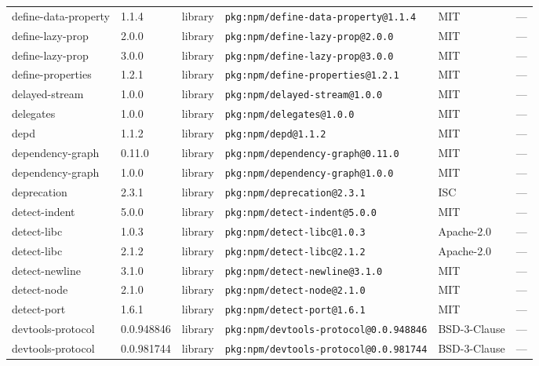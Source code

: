 \documentclass[11pt,a4paper]{article}
\begin{document}
\begin{longtable}{|p{4cm}|p{2cm}|p{1.6cm}|p{5cm}|p{1.5cm}|p{3.5cm}|}
\raggedright define-data-property & 1.1.4 & library & \small\texttt{pkg:npm/define-data-property@1.1.4} & MIT & \small — \\
\raggedright define-lazy-prop & 2.0.0 & library & \small\texttt{pkg:npm/define-lazy-prop@2.0.0} & MIT & \small — \\
\raggedright define-lazy-prop & 3.0.0 & library & \small\texttt{pkg:npm/define-lazy-prop@3.0.0} & MIT & \small — \\
\raggedright define-properties & 1.2.1 & library & \small\texttt{pkg:npm/define-properties@1.2.1} & MIT & \small — \\
\raggedright delayed-stream & 1.0.0 & library & \small\texttt{pkg:npm/delayed-stream@1.0.0} & MIT & \small — \\
\raggedright delegates & 1.0.0 & library & \small\texttt{pkg:npm/delegates@1.0.0} & MIT & \small — \\
\raggedright depd & 1.1.2 & library & \small\texttt{pkg:npm/depd@1.1.2} & MIT & \small — \\
\raggedright dependency-graph & 0.11.0 & library & \small\texttt{pkg:npm/dependency-graph@0.11.0} & MIT & \small — \\
\raggedright dependency-graph & 1.0.0 & library & \small\texttt{pkg:npm/dependency-graph@1.0.0} & MIT & \small — \\
\raggedright deprecation & 2.3.1 & library & \small\texttt{pkg:npm/deprecation@2.3.1} & ISC & \small — \\
\raggedright detect-indent & 5.0.0 & library & \small\texttt{pkg:npm/detect-indent@5.0.0} & MIT & \small — \\
\raggedright detect-libc & 1.0.3 & library & \small\texttt{pkg:npm/detect-libc@1.0.3} & Apache-2.0 & \small — \\
\raggedright detect-libc & 2.1.2 & library & \small\texttt{pkg:npm/detect-libc@2.1.2} & Apache-2.0 & \small — \\
\raggedright detect-newline & 3.1.0 & library & \small\texttt{pkg:npm/detect-newline@3.1.0} & MIT & \small — \\
\raggedright detect-node & 2.1.0 & library & \small\texttt{pkg:npm/detect-node@2.1.0} & MIT & \small — \\
\raggedright detect-port & 1.6.1 & library & \small\texttt{pkg:npm/detect-port@1.6.1} & MIT & \small — \\
\raggedright devtools-protocol & 0.0.948846 & library & \small\texttt{pkg:npm/devtools-protocol@0.0.948846} & BSD-3-Clause & \small — \\
\raggedright devtools-protocol & 0.0.981744 & library & \small\texttt{pkg:npm/devtools-protocol@0.0.981744} & BSD-3-Clause & \small — \\

\end{longtable}
\end{document}
